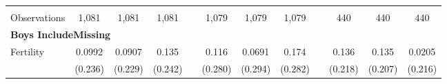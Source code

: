 \begin{landscape}
\begin{table}[htpb!]
\begin{center}
\begin{tabular}{lcccp{2mm}cccp{2mm}ccc}
\begin{footnotesize}\end{footnotesize}&\begin{footnotesize}\end{footnotesize}&\begin{footnotesize}\end{footnotesize}&\begin{footnotesize}\end{footnotesize}&\begin{footnotesize}\end{footnotesize}&\begin{footnotesize}\end{footnotesize}&\begin{footnotesize}\end{footnotesize}&\begin{footnotesize}\end{footnotesize}&\begin{footnotesize}\end{footnotesize}&\begin{footnotesize}\end{footnotesize}&\begin{footnotesize}\end{footnotesize}&\begin{footnotesize}\end{footnotesize}\\Observations&1,081&1,081&1,081&&1,079&1,079&1,079&&440&440&440\\
\multicolumn{12}{l}{\textbf{Boys IncludeMissing}}\\ 
Fertility&0.0992&0.0907&0.135&&0.116&0.0691&0.174&&0.136&0.135&0.0205\\
&(0.236)&(0.229)&(0.242)&&(0.280)&(0.294)&(0.282)&&(0.218)&(0.207)&(0.216)\\

\end{tabular}
\end{center}
\end{table}
\end{landscape}
